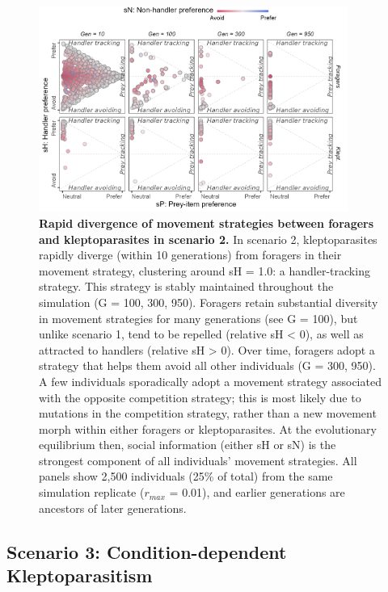 \begin{figure}[t!]
    \centering
    \includegraphics[width=0.9\textwidth]{figures/kleptomove/fig_03.png}
    \caption{
       \textbf{Rapid divergence of movement strategies between foragers and kleptoparasites in scenario 2.}
       In scenario 2, kleptoparasites rapidly diverge (within 10 generations) from foragers in their movement strategy, clustering around sH = 1.0: a handler-tracking strategy.
       This strategy is stably maintained throughout the simulation (G = 100, 300, 950).
       Foragers retain substantial diversity in movement strategies for many generations (see G = 100), but unlike scenario 1, tend to be repelled (relative sH < 0), as well as attracted to handlers (relative sH > 0).
       Over time, foragers adopt a strategy that helps them avoid all other individuals (G = 300, 950).
       A few individuals sporadically adopt a movement strategy associated with the opposite competition strategy; this is most likely due to mutations in the competition strategy, rather than a new movement morph within either foragers or kleptoparasites.
       At the evolutionary equilibrium then, social information (either sH or sN) is the strongest component of all individuals' movement strategies.
       All panels show 2,500 individuals (25\% of total) from the same simulation replicate ($r_{max}$ = 0.01), and earlier generations are ancestors of later generations.
    }
    \label{klepto_fig_03}
\end{figure}

\subsection*{Scenario 3: Condition-dependent Kleptoparasitism}

